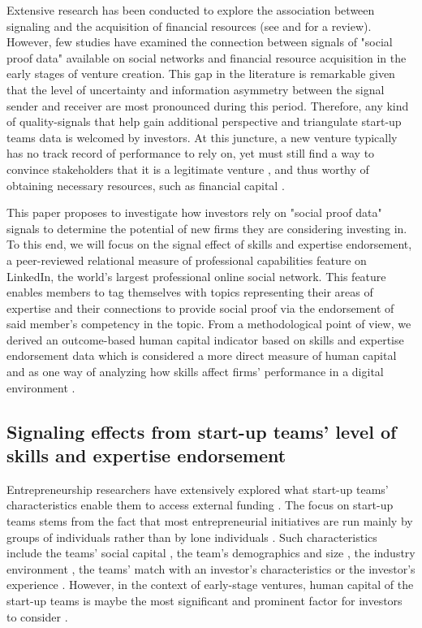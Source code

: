 \documentclass[12pt]{article}
\begin{document}
Extensive research has been conducted to explore the association between signaling and the acquisition of financial resources (see \citep{connelly2011signaling} and \citet{colombo2021use} for a review). However, few studies have examined the connection between signals of "social proof data" available on social networks and financial resource acquisition in the early stages of venture creation. This gap in the literature is remarkable given that the level of uncertainty \citep{matusik2008values} and information asymmetry between the signal sender and receiver \citep{spence2002signaling} are most pronounced during this period. Therefore, any kind of quality-signals that help gain additional perspective and triangulate start-up teams data is welcomed by investors. At this juncture, a new venture typically has no track record of performance to rely on, yet must still find a way to convince stakeholders that it is a legitimate venture \citep{becker2015new}, and thus worthy of obtaining necessary resources, such as financial capital \citep{ko2018signaling}.

This paper proposes to investigate how investors rely on "social proof data" signals to determine the potential of new firms they are considering investing in. To this end, we will focus on the signal effect of skills and expertise endorsement, a peer-reviewed relational measure of professional capabilities feature on LinkedIn, the world's largest professional online social network. This feature enables members to tag themselves with topics representing their areas of expertise and their connections to provide social proof via the endorsement of said member's competency in the topic. From a methodological point of view, we derived an outcome-based human capital indicator based on skills and expertise endorsement data which is considered a more direct measure of human capital and as one way of analyzing how skills affect firms' performance in a digital environment \citep{marvel2016human}.

\subsection{Signaling effects from start-up teams' level of skills and expertise endorsement}

Entrepreneurship researchers have extensively explored what start-up teams' characteristics enable them to access external funding \citep{roure1990predictors}. The focus on start-up teams stems from the fact that most entrepreneurial initiatives are run mainly by groups of individuals rather than by lone individuals \citep{klotz2014new}. Such characteristics include the teams' social capital \citep{shane2002network}, the team's demographics and size \citep{eisenhardt1990organizational}, the industry environment \citep{townsend2015turning}, the teams' match with an investor's characteristics \citep{aggarwal2015evaluating} or the investor's experience \citep{franke2008venture}. However, in the context of early-stage ventures, human capital of the start-up teams is maybe the most significant and prominent factor for investors to consider \citep{beckman2007early, ko2018signaling, matusik2008values}.
\end{document}
